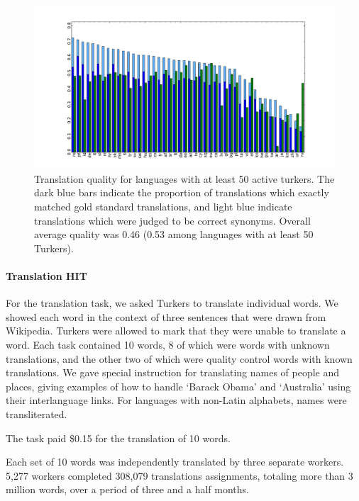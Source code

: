 \documentclass[11pt]{article}
\begin{document}
\begin{figure}[h]
\includegraphics[width=\linewidth]{final-figures/Google-match-bar}
\caption{Translation quality for languages with at least 50 active turkers.  The dark blue bars indicate the proportion of translations which exactly matched gold standard translations, and light blue indicate translations which were judged to be correct synonyms.  Overall average quality was 0.46 (0.53 among languages with at least 50 Turkers).}
\label{hitlangqual}
\end{figure}



\paragraph{Translation HIT}

For the translation task, we asked Turkers to translate individual words.  We showed each word in the context of three sentences that were drawn from Wikipedia.  
Turkers were allowed to mark that they were unable to translate a word. Each task contained 10 words, 8 of which were words with unknown translations, and the other two of which were quality control words with known translations.   
We gave special instruction for translating names of people and places, giving examples of how to handle `Barack Obama' and `Australia' using their interlanguage links. For languages with non-Latin alphabets, names were transliterated. 

The task paid \$0.15 for the translation of 10 words.  

Each set of 10 words was independently translated by three separate workers.  5,277 workers completed 308,079 translations assignments, totaling more than 3 million words, over a period of three and a half months.
\end{document}
